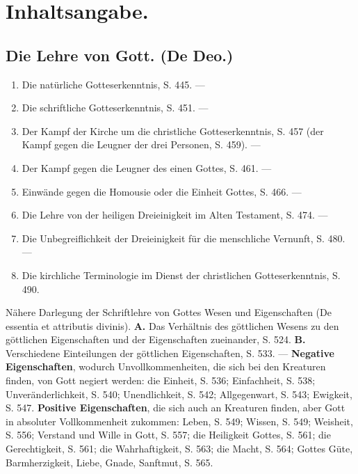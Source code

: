 \section*{Inhaltsangabe.}

\subsection*{Die Lehre von Gott. (De Deo.)}
\begin{enumerate}
    \item Die natürliche Gotteserkenntnis, S. 445. ---
    \item Die schriftliche Gotteserkenntnis, S. 451. ---
    \item Der Kampf der Kirche um die christliche Gotteserkenntnis, S. 457 (der Kampf gegen die Leugner der drei Personen, S. 459). ---
    \item Der Kampf gegen die Leugner des einen Gottes, S. 461. ---
    \item Einwände gegen die Homousie oder die Einheit Gottes, S. 466. ---
    \item Die Lehre von der heiligen Dreieinigkeit im Alten Testament, S. 474. ---
    \item Die Unbegreiflichkeit der Dreieinigkeit für die menschliche Vernunft, S. 480. ---
    \item Die kirchliche Terminologie im Dienst der christlichen Gotteserkenntnis, S. 490.
\end{enumerate}
Nähere Darlegung der Schriftlehre von Gottes Wesen und Eigenschaften (De essentia et attributis divinis). \textbf{A.} Das Verhältnis des göttlichen Wesens zu den göttlichen Eigenschaften und der Eigenschaften zueinander, S. 524. \textbf{B.} Verschiedene Einteilungen der göttlichen Eigenschaften, S. 533. ---
\textbf{Negative Eigenschaften}, wodurch Unvollkommenheiten, die sich bei den Kreaturen finden, von Gott negiert werden: die Einheit, S. 536; Einfachheit, S. 538; Unveränderlichkeit, S. 540; Unendlichkeit, S. 542; Allgegenwart, S. 543; Ewigkeit, S. 547.
\textbf{Positive Eigenschaften}, die sich auch an Kreaturen finden, aber Gott in absoluter Vollkommenheit zukommen: Leben, S. 549; Wissen, S. 549; Weisheit, S. 556; Verstand und Wille in Gott, S. 557; die Heiligkeit Gottes, S. 561; die Gerechtigkeit, S. 561; die Wahrhaftigkeit, S. 563; die Macht, S. 564; Gottes Güte, Barmherzigkeit, Liebe, Gnade, Sanftmut, S. 565.


